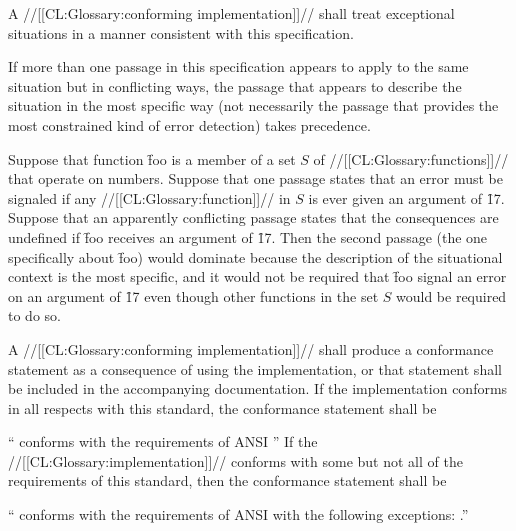 
A //[[CL:Glossary:conforming implementation]]// shall treat exceptional situations  in a manner consistent with this specification.

If more than one passage in this specification appears to apply to the same situation but in conflicting ways, the passage that appears to describe the situation in the most specific way (not necessarily the passage that provides the most constrained kind of error detection)  takes precedence.


Suppose that function \f{foo} is a member of a set $S$ of //[[CL:Glossary:functions]]// that operate on numbers.  Suppose that one passage states that an error must be signaled if any //[[CL:Glossary:function]]// in $S$ is ever given an argument of \f{17}. Suppose that an apparently conflicting passage states that the consequences  are undefined if \f{foo} receives an argument of \f{17}.  Then the second passage (the one specifically about \f{foo}) would dominate because the description of the situational context is the most specific, and it would not be required that \f{foo} signal an error on an argument of \f{17} even though other functions in  the set $S$ would be required to do so.

\endsubsubsubsubsection%

\endsubsubsubsection%

\endsubsubsection%


A //[[CL:Glossary:conforming implementation]]// shall produce a conformance statement  as a consequence of using the implementation, or that statement shall be included in the accompanying documentation.  If the implementation conforms in all respects with this standard, the conformance statement shall be
  \beginlist \item{} `` conforms with the requirements  	  of ANSI '' \endlist
  If the //[[CL:Glossary:implementation]]// conforms with some but not all of the requirements of this standard, then the conformance statement shall be
  \beginlist \item{} `` conforms with the requirements of 	  ANSI  with the following exceptions:  	  .'' \endlist 
  \endsubsubsection%

